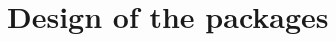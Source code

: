 \documentclass[a4paper]{article}
\begin{document}
  
  
  
  \appendix
  \renewcommand{\appendixname}{Appendix~\Alph{section}}
  
  
  \section{Design of the packages}
  \label{app:design}
  
\end{document}
